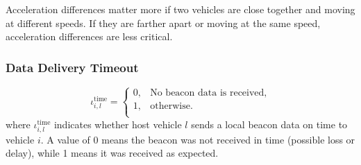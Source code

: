 \documentclass[letterpaper, 10pt, conference]{ieeeconf}  %
\begin{document}
Acceleration differences matter more if two vehicles are close together and moving at different speeds.
If they are farther apart or moving at the same speed, acceleration differences are less critical.

\subsubsection{Data Delivery Timeout}
\begin{equation}\label{deli_timeout}
    \iota_{i,l}^{\text{time}} =\begin{cases}
        0 , &\text{No beacon data is received,} \\
        1, &\text{otherwise.}\\
    \end{cases}
\end{equation}
where $\iota_{i,l}^{\text{time}}$ indicates whether host vehicle $l$ sends a local beacon data on time to vehicle $i$. A value of 0 means the beacon was not received in time (possible loss or delay), while 1 means it was received as expected.






\end{document}
